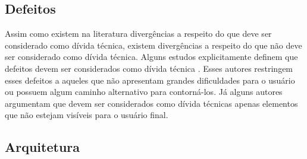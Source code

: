 \subsection{Defeitos}

Assim como existem na literatura divergências a respeito do que deve ser considerado como dívida técnica, existem divergências a respeito do que não deve ser considerado como dívida técnica. Alguns estudos explicitamente definem que defeitos devem ser considerados como dívida técnica \cite{davis2013driving,guo2011portfolio,xuan2012debt}. Esses autores restringem esses defeitos a aqueles que não apresentam grandes dificuldades para o usuário ou possuem algum caminho alternativo para contorná-los. Já alguns autores argumentam que devem ser considerados como dívida técnicas apenas elementos que não estejam visíveis para o usuário final\cite{kruchten2013technical}. 

\subsection{Arquitetura}
\label{tipo_td_arquitetura}

